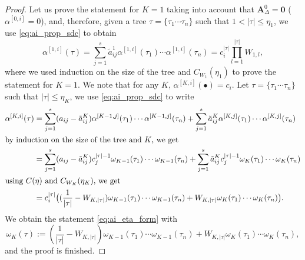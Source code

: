 \documentclass[sn-mathphys-num]{sn-jnl}%
\newcommand{\reva}[1]{#1}%
\theoremstyle{thmstyleone}%
\theoremstyle{thmstyletwo}%
\theoremstyle{thmstylethree}%
\begin{document}
\begin{proof}
    Let us prove the statement for $K = 1$ taking into account that $\bm{A}_\Delta^0 = \bm{0}$ ($\alpha^{[0,i]} = 0$), and, therefore, given a tree $\tau = \reva{\{\tau_1 \cdots \tau_n \}}$ such that $1 < |\tau| \leq \eta_1$, we use \eqref{eq:ai_prop_sdc} to obtain
    \[ \alpha^{[1,i]} (\tau) = \sum_{j=1}^s \tilde{a}^{1}_{ij} \alpha^{[1,i]} (\tau_1) \cdots \alpha^{[1,i]} (\tau_n) = c_i^{|\tau|} \prod_{l=1}^{|\tau|} W_{1,l}, \]
    where we used induction on the size of the tree and $C_{W_1}(\eta_1)$ to prove the statement for $K=1$.
    We note that for any $K$, $\alpha^{[K,i]}(\bullet) = c_i$. Let $\tau = \reva{\{\tau_1 \cdots \tau_n \}}$ such that $|\tau| \leq \eta_K$, we use \eqref{eq:ai_prop_sdc} to write
    \begin{align*}
        \alpha^{[K,i]} (\tau) &= \sum_{j=1}^s (a_{ij} - \tilde{a}^{K}_{ij}) \reva{\alpha^{[K-1,j]}(\tau_1) \cdots \alpha^{[K-1,j]}(\tau_n)} + \sum_{j=1}^s \tilde{a}^{K}_{ij} \reva{\alpha^{[K,j]} (\tau_1) \cdots \alpha^{[K,j]} (\tau_n)} \\
        \shortintertext{by induction on the size of the tree and $K$, we get}
                              &= \sum_{j=1}^s (a_{ij} - \tilde{a}^{K}_{ij}) c_j^{|\tau|-1} \reva{\omega_{K-1}(\tau_1) \cdots \omega_{K-1}(\tau_n)} + \sum_{j=1}^s \tilde{a}^{K}_{ij} c_j^{|\tau|-1} \reva{\omega_K (\tau_1) \cdots \omega_K (\tau_n)} \\
        \shortintertext{using $C(\eta)$ and $C_{W_K}(\eta_K)$, we get}
        &= c_i^{|\tau|} \big((\frac{1}{|\tau|} - W_{K,|\tau|}) \reva{\omega_{K-1}(\tau_1) \cdots \omega_{K-1}(\tau_n)} + W_{K,|\tau|} \reva{\omega_K (\tau_1) \cdots \omega_K (\tau_n)} \big).
    \end{align*}
    We obtain the statement \eqref{eq:ai_eta_form} with
    \[ \omega_K (\tau) := (\frac{1}{|\tau|} - W_{K,|\tau|}) \reva{\omega_{K-1}(\tau_1) \cdots \omega_{K-1}(\tau_n)} + W_{K,|\tau|} \reva{\omega_K (\tau_1) \cdots \omega_K (\tau_n)},\]
    and the proof is finished.
\end{proof}
\end{document}
